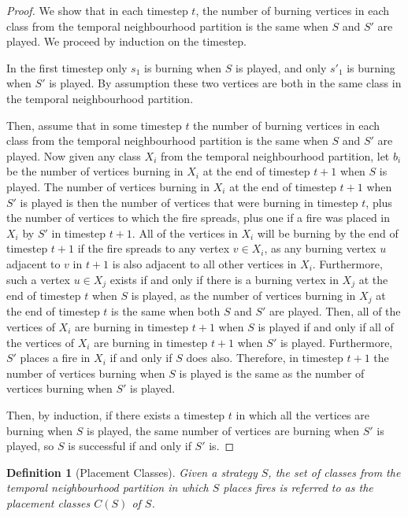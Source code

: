 \documentclass[preprint,12pt]{elsarticle}
\newtheorem{definition}{Definition}
\begin{document}
\begin{proof}
    We show that in each timestep $t$, the number of burning vertices in each class from the temporal neighbourhood partition is the same when $S$ and $S'$ are played. We proceed by induction on the timestep.

    In the first timestep only $s_1$ is burning when $S$ is played, and only $s'_1$ is burning when $S'$ is played. By assumption these two vertices are both in the same class in the temporal neighbourhood partition.

    Then, assume that in some timestep $t$ the number of burning vertices in each class from the temporal neighbourhood partition is the same when $S$ and $S'$ are played. Now given any class $X_i$ from the temporal neighbourhood partition, let $b_i$ be the number of vertices burning in $X_i$ at the end of timestep $t+1$ when $S$ is played. The number of vertices burning in $X_i$ at the end of timestep $t+1$ when $S'$ is played is then the number of vertices that were burning in timestep $t$, plus the number of vertices to which the fire spreads, plus one if a fire was placed in $X_i$ by $S'$ in timestep $t+1$. All of the vertices in $X_i$ will be burning by the end of timestep $t+1$ if the  fire spreads to any vertex $v \in X_i$, as any burning vertex $u$ adjacent to $v$ in $t+1$ is also adjacent to all other vertices in $X_i$. Furthermore, such a vertex $u \in X_j$ exists if and only if there is a burning vertex in $X_j$ at the end of timestep $t$ when $S$ is played, as the number of vertices burning in $X_j$ at the end of timestep $t$ is the same when both $S$ and $S'$ are played. Then, all of the vertices of $X_i$ are burning in timestep $t+1$ when $S$ is played if and only if all of the vertices of $X_i$ are burning in timestep $t+1$ when $S'$ is played. Furthermore, $S'$ places a fire in $X_i$ if and only if $S$ does also. Therefore, in timestep $t+1$ the number of vertices burning when $S$ is played is the same as the number of vertices burning when $S'$ is played.

    Then, by induction, if there exists a timestep $t$ in which all the vertices are burning when $S$ is played, the same number of vertices are burning when $S'$ is played, so $S$ is successful if and only if $S'$ is.
\end{proof}


\begin{definition}[Placement Classes]
   Given a strategy $S$, the set of classes from the temporal neighbourhood partition in which $S$ places fires is referred to as the placement classes $C(S)$ of $S$.
\end{definition}
\end{document}
